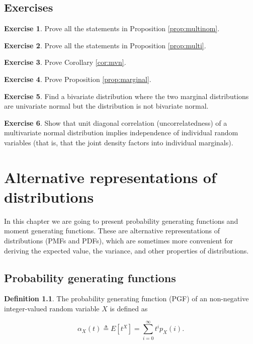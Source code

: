 \documentclass{book}
\theoremstyle{plain}%
\theoremstyle{definition}
\newtheorem{definition}{Definition}[section]
\newtheorem{exercise}{Exercise}[chapter]
\begin{document}
\section*{Exercises}

\begin{exercise}
Prove all the statements in Proposition \ref{prop:multinom}.
\end{exercise}


\begin{exercise}
Prove all the statements in Proposition \ref{prop:multi}.
\end{exercise}

\begin{exercise}
Prove Corollary \ref{cor:mvn}.
\end{exercise}

\begin{exercise}
Prove Proposition \ref{prop:marginal}.
\end{exercise}

\begin{exercise}
Find a bivariate distribution where the two marginal distributions are univariate normal but the distribution is not bivariate normal.\label{ex:mvn}
\end{exercise}

\begin{exercise}
Show that unit diagonal correlation (uncorrelatedness) of a multivariate normal distribution implies independence of individual random variables (that is, that the joint density factors into individual marginals).
\end{exercise}


\chapter{Alternative representations of distributions}

In this chapter we are going to present probability generating functions and moment generating functions. These are alternative representations of distributions (PMFs and PDFs), which are sometimes more convenient for deriving the expected value, the variance, and other properties of distributions.

\section{Probability generating functions}

\begin{definition}
The probability generating function (PGF) of an non-negative integer-valued random variable $X$ is defined as

$$\alpha_X(t) \triangleq E[t^X] = \sum_{i = 0}^\infty t^ip_X(i) .$$
\end{definition}
\end{document}
